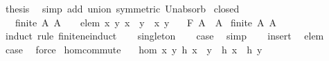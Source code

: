 \begin{isabellebody}
\ {\isacharquery}{\kern0pt}thesis\ \isamarkupfalse%
\ {\isacharparenleft}{\kern0pt}simp\ add{\isacharcolon}{\kern0pt}\ union\ {\isacharbrackleft}{\kern0pt}symmetric{\isacharbrackright}{\kern0pt}\ Un{\isacharunderscore}{\kern0pt}absorb{}{\isacharparenright}{\kern0pt}\isanewline
{}\isamarkupfalse%
%
\endisatagproof
{\isafoldproof}%
%
\isadelimproof
\isanewline
%
\endisadelimproof
\isanewline
{}\isamarkupfalse%
\ closed{\isacharcolon}{\kern0pt}\isanewline
\ \ \ {\isachardoublequoteopen}finite\ A{\isachardoublequoteclose}\ {\isachardoublequoteopen}A\ {\isasymnoteq}\ {\isacharbraceleft}{\kern0pt}{\isacharbraceright}{\kern0pt}{\isachardoublequoteclose}\ \ elem{\isacharcolon}{\kern0pt}\ {\isachardoublequoteopen}{\isasymAnd}x\ y{\isachardot}{\kern0pt}\ x\ \isactrlbold {\isacharasterisk}{\kern0pt}\ y\ {\isasymin}\ {\isacharbraceleft}{\kern0pt}x{\isacharcomma}{\kern0pt}\ y{\isacharbraceright}{\kern0pt}{\isachardoublequoteclose}\isanewline
\ \ \ {\isachardoublequoteopen}F\ A\ {\isasymin}\ A{\isachardoublequoteclose}\isanewline
%
\isadelimproof
%
\endisadelimproof
%
\isatagproof
{}\isamarkupfalse%
\ {\isacartoucheopen}finite\ A{\isacartoucheclose}\ {\isacartoucheopen}A\ {\isasymnoteq}\ {\isacharbraceleft}{\kern0pt}{\isacharbraceright}{\kern0pt}{\isacartoucheclose}\ \isamarkupfalse%
\ {\isacharparenleft}{\kern0pt}induct\ rule{\isacharcolon}{\kern0pt}\ finite{\isacharunderscore}{\kern0pt}ne{\isacharunderscore}{\kern0pt}induct{\isacharparenright}{\kern0pt}\isanewline
\ \ \isamarkupfalse%
\ singleton\ \isamarkupfalse%
\ \isamarkupfalse%
\ {\isacharquery}{\kern0pt}case\ \isamarkupfalse%
\ simp\isanewline
{}\isamarkupfalse%
\isanewline
\ \ \isamarkupfalse%
\ insert\ \isamarkupfalse%
\ elem\ \isamarkupfalse%
\ {\isacharquery}{\kern0pt}case\ \isamarkupfalse%
\ force\isanewline
{}\isamarkupfalse%
%
\endisatagproof
{\isafoldproof}%
%
\isadelimproof
\isanewline
%
\endisadelimproof
\isanewline
{}\isamarkupfalse%
\ hom{\isacharunderscore}{\kern0pt}commute{\isacharcolon}{\kern0pt}\isanewline
\ \ \ hom{\isacharcolon}{\kern0pt}\ {\isachardoublequoteopen}{\isasymAnd}x\ y{\isachardot}{\kern0pt}\ h\ {\isacharparenleft}{\kern0pt}x\ \isactrlbold {\isacharasterisk}{\kern0pt}\ y{\isacharparenright}{\kern0pt}\ {\isacharequal}{\kern0pt}\ h\ x\ \isactrlbold {\isacharasterisk}{\kern0pt}\ h\ y{\isachardoublequoteclose}\isanewline

\end{isabellebody}
